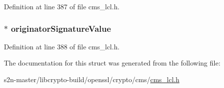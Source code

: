 Definition at line 387 of file cms\+\_\+lcl.\+h.

\subsubsection[{\texorpdfstring{originator\+Signature\+Value}{originatorSignatureValue}}]{$\ast$ originator\+Signature\+Value}\hypertarget{struct_c_m_s___receipt__st_a063fd09dae9d4cb2f1086f06810b4145}{}\label{struct_c_m_s___receipt__st_a063fd09dae9d4cb2f1086f06810b4145}


Definition at line 388 of file cms\+\_\+lcl.\+h.



The documentation for this struct was generated from the following file\+:\begin{DoxyCompactItemize}
\item 
s2n-\/master/libcrypto-\/build/openssl/crypto/cms/\hyperlink{cms__lcl_8h}{cms\+\_\+lcl.\+h}\end{DoxyCompactItemize}
